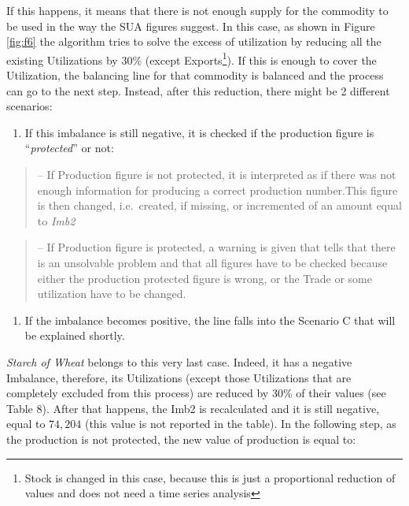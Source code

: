 \documentclass[]{article}
\providecommand{\tightlist}{%
  \setlength{\itemsep}{0pt}\setlength{\parskip}{0pt}}
\let\rmarkdownfootnote\footnote%
\def\footnote{\protect\rmarkdownfootnote}
\begin{document}
If this happens, it means that there is not enough supply for the
commodity to be used in the way the SUA figures suggest. In this case,
as shown in Figure \ref{fig:f6} the algorithm tries to solve the excess
of utilization by reducing all the existing Utilizations by 30\% (except
Exports\footnote{Stock is changed in this case, because this is just a
  proportional reduction of values and does not need a time series
  analysis}). If this is enough to cover the Utilization, the balancing
line for that commodity is balanced and the process can go to the next
step. Instead, after this reduction, there might be 2 different
scenarios:

\begin{enumerate}
\def\labelenumi{\arabic{enumi}.}
\tightlist
\item
  If this imbalance is still negative, it is checked if the production
  figure is ``\emph{protected}'' or not:
\end{enumerate}

\begin{quote}
-- If Production figure is not protected, it is interpreted as if there
was not enough information for producing a correct production
number.This figure is then changed, i.e.~created, if missing, or
incremented of an amount equal to \emph{Imb2}
\end{quote}

\begin{quote}
-- If Production figure is protected, a warning is given that tells that
there is an unsolvable problem and that all figures have to be checked
because either the production protected figure is wrong, or the Trade or
some utilization have to be changed.
\end{quote}

\begin{enumerate}
\def\labelenumi{\arabic{enumi}.}
\setcounter{enumi}{1}
\tightlist
\item
  If the imbalance becomes positive, the line falls into the Scenario C
  that will be explained shortly.
\end{enumerate}

\emph{Starch of Wheat} belongs to this very last case. Indeed, it has a
negative Imbalance, therefore, its Utilizations (except those
Utilizations that are completely excluded from this process) are reduced
by 30\% of their values (see Table 8). After that happens, the Imb2 is
recalculated and it is still negative, equal to \(74,204\) (this value
is not reported in the table). In the following step, as the production
is not protected, the new value of production is equal to:
\end{document}

